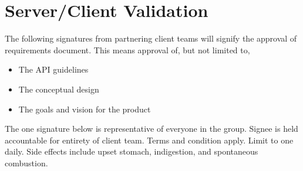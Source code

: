 \chapter{Server/Client Validation}
The following signatures from partnering client teams will signify the approval of requirements document. This means approval of, but not limited to,

\begin{itemize}
    \item The API guidelines
    \item The conceptual design
    \item The goals and vision for the product
\end{itemize}

The one signature below is representative of everyone in the group. Signee is held accountable for entirety of client team. Terms and condition apply. Limit to one daily. Side effects include upset stomach, indigestion, and spontaneous combustion.

\vfill
\noindent {} \hfill {} \hfill {}
